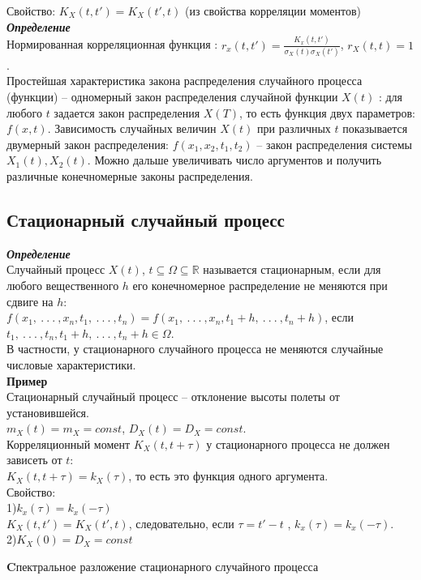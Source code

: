 \documentclass[russian, 12pt, fleqn]{article}
\begin{document}
Свойство: $K_X(t, t') = K_X(t', t)$ (из свойства корреляции моментов)\\
\textit{\textbf{Определение}}\\ 
Нормированная корреляционная функция : $r_x(t, t') = \frac{K_x(t, t')}{\sigma_X(t) \sigma_X(t')}$, $r_X(t, t) = 1$.\\
Простейшая характеристика закона распределения случайного процесса (функции) -- одномерный закон  распределения случайной функции $X(t)$ : для любого $t$ задается закон распределения $X(T)$,  то есть функция двух параметров: $f(x, t)$. Зависимость случайных величин $X(t)$ при различных $t$ показывается двумерный закон распределения:  $f(x_1, x_2, t_1, t_2)$ -- закон распределения системы $X_1(t), X_2(t)$. Можно дальше увеличивать число аргументов и получить различные конечномерные законы распределения.
\subsection{Стационарный случайный процесс}
\noindent
\textit{\textbf{Определение}}\\ 
Случайный процесс $X(t)$, $t \subseteq \Omega \subseteq $\(\mathbb{R}\) называется стационарным, если для любого вещественного $h$ его конечномерное распределение не меняются при сдвиге на $h$:\\
$f(x_1,\ .\ .\ .\ ,x_n, t_1,\ .\ .\ .\ ,t_n) =  f(x_1,\ .\ .\ .\ ,x_n, t_1 + h,\ .\ .\ .\ ,t_n + h)$, если $t_1,\ .\ .\ .\ , t_n, t_1 + h,\ .\ .\ .\ ,t_n + h \in \Omega$.\\
В частности, у стационарного случайного процесса не меняются случайные числовые характеристики.\\
\textbf{Пример} \\
Стационарный случайный процесс -- отклонение высоты полеты от установившейся.\\
$m_X(t) = m_X = const$, $D_X(t) = D_X = const$.\\
Корреляционный момент $K_X(t, t + \tau)$ у стационарного процесса не должен зависеть от $t$:\\
$K_X(t, t + \tau) = k_X(\tau)$, то есть это функция одного аргумента.\\
Свойство:\\
1)$k_x(\tau) = k_x(-\tau)$\\
$K_X(t, t') = K_X(t', t)$, следовательно, если $\tau = t' - t$ , $k_x(\tau) = k_x(-\tau)$.\\
2)$K_X(0) = D_X = const$\\
\begin{center}
$\textbf{Cпектральное разложение стационарного случайного процесса}$
\end{center}
\end{document}

